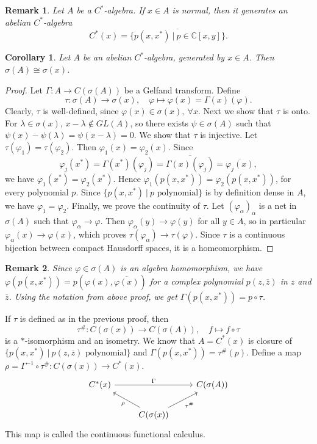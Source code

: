 \documentclass[10pt, a4paper]{article}
\newtheorem{corollary}[thm]{Corollary}
\newtheorem*{remark}{Remark}
\newenvironment{noticeC}{%
  \tcolorbox[%
  notitle,
  empty,
  enhanced,  %
  breakable,
  coltext=black, 
  fontupper=\rmfamily,
  noparskip,
  sharp corners,
  boxrule=-1pt,  %
  frame hidden,
  left=7pt,  %
  right=7pt,
  top=5pt,
  bottom=5pt,
  before skip=2.5ex plus 2pt,
  after skip=2.5ex plus 2pt,
  overlay unbroken and last={%
  },
  ]}
{\endtcolorbox}
\newenvironment{myproof}%
  {\begin{noticeC}\begin{proof}}%
  {\end{proof}\end{noticeC}}
\newcommand{\C}{\mathbb {C}}
\begin{document}
\begin{remark}
  Let $A$ be a $C^*$-algebra. If $x \in A$ is normal, then it generates an abelian $C^*$-algebra
  $$C^* (x) = \overline{\{p(x, x^*)\ |\ p \in \C[x, y]\}}.$$
\end{remark}

\begin{corollary}
  Let $A$ be an abelian $C^*$-algebra, generated by $x \in A$. Then $\sigma (A) \cong \sigma(x)$.
\end{corollary}

\begin{myproof}
  Let $\Gamma: A \to C(\sigma(A))$ be a Gelfand transform.
  Define $$\tau: \sigma(A) \to \sigma(x),\quad \varphi \mapsto \varphi(x) = \Gamma(x) (\varphi).$$
  Clearly, $\tau$ is well-defined, since $\varphi(x) \in \sigma (x),\ \forall x$.
  Next we show that $\tau$ is onto. For $\lambda \in \sigma(x)$,
  $x - \lambda \notin GL(A)$, so there exists $\psi \in \sigma(A)$ such that $\psi(x) - \psi (\lambda) = \psi (x - \lambda) = 0$.
  We show that $\tau$ is injective. Let $\tau (\varphi_1) = \tau(\varphi_2)$.
  Then $\varphi_1(x) = \varphi_2(x)$. Since 
  $$\varphi_j (x^*) = \Gamma(x^*) (\varphi_j) = \overline{\Gamma(x)(\varphi_j)} = \overline{\varphi_j(x)},$$
  we have $\varphi_1(x^*) = \varphi_2(x^*)$. Hence $\varphi_1 (p(x, x^*)) = \varphi_2(p(x, x^*))$, for every polynomial $p$.
  Since $\{p(x, x^*)\ |\ \textrm{$p$ polynomial}\}$ is by definition dense in $A$, we have $\varphi_1 = \varphi_2$.
  Finally, we prove the continuity of $\tau$. Let $(\varphi_\alpha)_{\alpha}$ is a net in $\sigma(A)$ such that $\varphi_\alpha \to \varphi$.
  Then $\varphi_\alpha(y) \to \varphi(y)$ for all $y \in A$, so in particular $\varphi_\alpha (x) \to \varphi(x)$,
  which proves $\tau (\varphi_\alpha) \to \tau(\varphi)$. Since $\tau$ is a continuous bijection between compact
  Hausdorff spaces, it is a homeomorphism.
\end{myproof}

\begin{remark}
  Since $\varphi \in \sigma(A)$ is an algebra homomorphism, we have $\varphi(p(x, x^*)) = p(\varphi(x), \overline{\varphi(x)})$
  for a complex polynomial $p(z, \overline{z})$ in $z$ and $\overline{z}$. Using the notation from above proof, 
  we get $\Gamma (p(x, x^*)) = p \circ \tau$.
\end{remark}

If $\tau$ is defined as in the previous proof, then $$\tau^{\#}: C(\sigma(x)) \to C(\sigma(A)),\quad f \mapsto f \circ \tau$$
is a $*$-isomorphism and an isometry. We know that $A = C^*(x)$ is closure of $\{p(x, x^*)\ |\ \textrm{$p (z, \overline{z})$ polynomial}\}$
and $\Gamma (p(x, x^*)) = \tau^{\#} (p)$. Define a map $\rho = \Gamma^{-1} \circ \tau^{\#}: C(\sigma(x)) \to C^*(x)$.
\[\begin{tikzcd}
	{C^*(x)} && {C(\sigma(A))} \\
	& {C(\sigma(x))}
	\arrow["{\tau^{\#}}"', from=2-2, to=1-3]
	\arrow["\rho", from=2-2, to=1-1]
	\arrow["\Gamma", from=1-1, to=1-3]
\end{tikzcd}\]
This map is called the continuous functional calculus.
\end{document}
